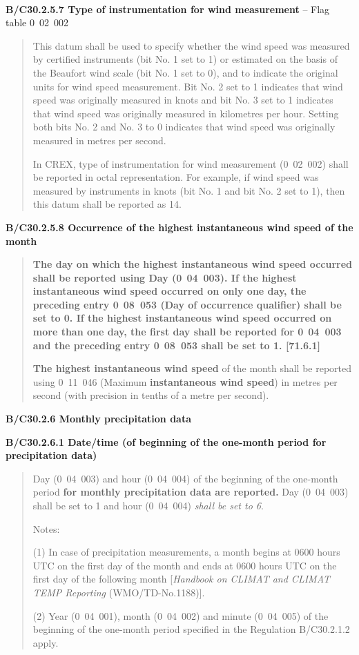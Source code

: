 \textbf{\\
}

\textbf{B/C30.2.5.7 Type of instrumentation for wind measurement} -- Flag table 0~02~002

\begin{quote}
This datum shall be used to specify whether the wind speed was measured by certified instruments (bit No. 1 set to 1) or estimated on the basis of the Beaufort wind scale (bit No. 1 set to 0), and to indicate the original units for wind speed measurement. Bit No. 2 set to 1 indicates that wind speed was originally measured in knots and bit No. 3 set to 1 indicates that wind speed was originally measured in kilometres per hour. Setting both bits No. 2 and No. 3 to 0 indicates that wind speed was originally measured in metres per second.

In CREX, type of instrumentation for wind measurement (0~02~002) shall be reported in octal representation. For example, if wind speed was measured by instruments in knots (bit No. 1 and bit No. 2 set to 1), then this datum shall be reported as 14.
\end{quote}

\textbf{B/C30.2.5.8 Occurrence of the highest instantaneous wind speed of the month}

\begin{quote}
\textbf{The day on which the highest instantaneous wind speed occurred shall be reported using Day (0}~\textbf{04~003). If the highest instantaneous wind speed occurred on only one day, the preceding entry 0}~\textbf{08~053 (Day of occurrence qualifier) shall be set to 0. If the highest instantaneous wind speed occurred on more than one day, the first day shall be reported for 0}~\textbf{04~003 and the preceding entry 0}~\textbf{08~053 shall be set to 1. {[}71.6.1{]}}

\textbf{The highest instantaneous wind speed} of the month shall be reported using 0~11~046 (Maximum \textbf{instantaneous wind speed}) in metres per second (with precision in tenths of a metre per second).
\end{quote}

\textbf{B/C30.2.6 Monthly precipitation data}

\textbf{B/C30.2.6.1 Date/time (of beginning of the one-month period for precipitation data)}

\begin{quote}
Day (0~04~003) and hour (0~04~004) of the beginning of the one-month period \textbf{for monthly precipitation data are reported.} Day (0~04~003) shall be set to 1 and hour (0~04~004) \emph{shall be set to 6}.

Notes:

(1) In case of precipitation measurements, a month begins at 0600 hours UTC on the first day of the month and ends at 0600 hours UTC on the first day of the following month {[}\emph{Handbook on CLIMAT and CLIMAT TEMP Reporting} (WMO/TD-No.1188){]}.

(2) Year (0~04~001), month (0~04~002) and minute (0~04~005) of the beginning of the one-month period specified in the Regulation B/C30.2.1.2 apply.
\end{quote}

